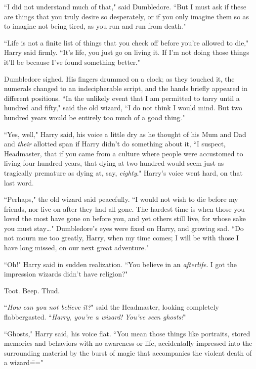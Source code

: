 ``I did not understand much of that," said Dumbledore. ``But I must ask if these are things that you truly desire so desperately, or if you only imagine them so as to imagine not being tired, as you run and run from death."

``Life is not a finite list of things that you check off before you're allowed to die," Harry said firmly. ``It's life, you just go on living it. If I'm not doing those things it'll be because I've found something better."

Dumbledore sighed. His fingers drummed on a clock; as they touched it, the numerals changed to an indecipherable script, and the hands briefly appeared in different positions. ``In the unlikely event that I am permitted to tarry until a hundred and fifty," said the old wizard, ``I do not think I would mind. But two hundred years would be entirely too much of a good thing."

``Yes, well," Harry said, his voice a little dry as he thought of his Mum and Dad and \emph{their} allotted span if Harry didn't do something about it, ``I suspect, Headmaster, that if you came from a culture where people were accustomed to living four hundred years, that dying at two hundred would seem just as tragically premature as dying at, say, \emph{eighty}." Harry's voice went hard, on that last word.

``Perhaps," the old wizard said peacefully. ``I would not wish to die before my friends, nor live on after they had all gone. The hardest time is when those you loved the most have gone on before you, and yet others still live, for whose sake you must stay{\ldots}" Dumbledore's eyes were fixed on Harry, and growing sad. ``Do not mourn me too greatly, Harry, when my time comes; I will be with those I have long missed, on our next great adventure."

``Oh!" Harry said in sudden realization. ``You believe in an \emph{afterlife}. I got the impression wizards didn't have religion?"

\later

Toot. Beep. Thud.

``\emph{How can you not believe it?}" said the Headmaster, looking completely flabbergasted. ``\emph{Harry, you're a wizard! You've seen ghosts!}"

``Ghosts," Harry said, his voice flat. ``You mean those things like portraits, stored memories and behaviors with no awareness or life, accidentally impressed into the surrounding material by the burst of magic that accompanies the violent death of a wizard\==="

